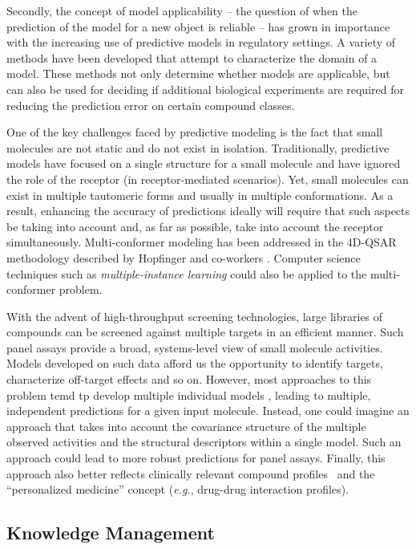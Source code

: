 \documentclass{sig-alternate}
\begin{document}
Secondly, the concept of model applicability -- the question of when
the prediction of the model for a new object is reliable -- has grown
in importance with the increasing use of predictive models in
regulatory settings. A variety of methods have been developed that
attempt to characterize the domain of a model. These methods not only
determine whether models are applicable, but can also be used for
deciding if additional biological experiments are required for
reducing the prediction error on certain compound classes.

One of the key challenges faced by predictive modeling is the fact
that small molecules are not static and do not exist in
isolation. Traditionally, predictive models have focused on a single
structure for a small molecule and have ignored the role of the
receptor (in receptor-mediated scenarios). Yet, small molecules can
exist in multiple tautomeric forms and usually in multiple
conformations. As a result, enhancing the accuracy of predictions
ideally will require that such aspects be taking into account and, as
far as possible, take into account the receptor
simultaneously. Multi-conformer modeling has been addressed in the
4D-QSAR methodology described by Hopfinger and co-workers
\cite{Albuquerque:1998ys}.  Computer science techniques such as
\emph{multiple-instance learning} could also be applied to the
multi-conformer problem.

With the advent of high-throughput screening technologies, large
libraries of compounds can be screened against multiple targets in an
efficient manner. Such panel assays provide a broad, systems-level
view of small molecule activities.  Models developed on such data
afford us the opportunity to identify targets, characterize off-target
effects and so on. However, most approaches to this problem temd tp
develop multiple individual models \cite{Chen:2010zr}, leading to
multiple, independent predictions for a given input molecule.
Instead, one could imagine an approach that takes into account the
covariance structure of the multiple observed activities and the
structural descriptors within a single model. Such an approach could
lead to more robust predictions for panel assays. Finally, this
approach also better reflects clinically relevant compound
profiles~\cite{kuhn2010} and the ``personalized medicine'' concept
(\emph{e.g.}, drug-drug interaction profiles).

\subsection{Knowledge Management}
\label{sec:knowledge-management}
\end{document}
